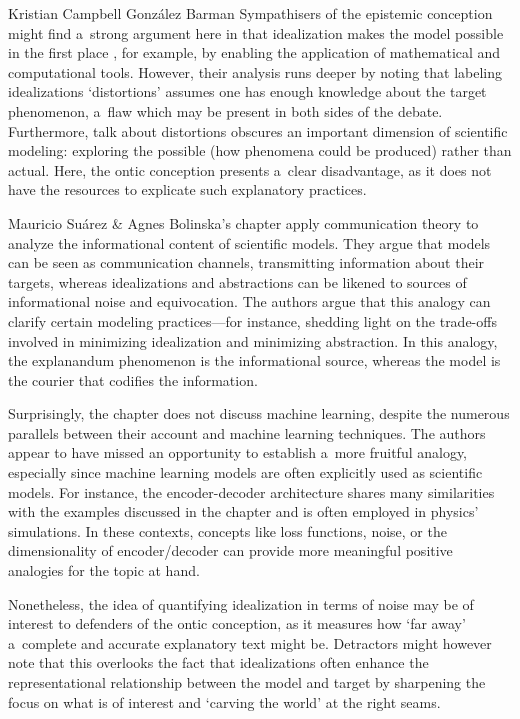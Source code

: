 \begin{recengenv}{Kristian Campbell González Barman}
Sympathisers of the epistemic conception might find a~strong argument here in that idealization makes the model possible in the first place
\parencite[][p.57]{cassini_models_2021}, %
 for example, by enabling the application of mathematical and computational tools. However, their analysis runs deeper by noting that labeling idealizations ‘distortions' assumes one has enough knowledge about the target phenomenon, a~flaw which may be present in both sides of the debate. Furthermore, talk about distortions obscures an important dimension of scientific modeling: exploring the possible (how phenomena could be produced) rather than actual. Here, the ontic conception presents a~clear disadvantage, as it does not have the resources to explicate such explanatory practices.

Mauricio Suárez \& Agnes Bolinska's chapter apply communication theory to analyze the informational content of scientific models. They argue that models can be seen as communication channels, transmitting information about their targets, whereas idealizations and abstractions can be likened to sources of informational noise and equivocation. The authors argue that this analogy can clarify certain modeling practices---for instance, shedding light on the trade-offs involved in minimizing idealization and minimizing abstraction. In this analogy, the explanandum phenomenon is the informational source, whereas the model is the courier that codifies the information.

\enlargethispage{-.5\baselineskip}

Surprisingly, the chapter does not discuss machine learning, despite the numerous parallels between their account and machine learning techniques. The authors appear to have missed an opportunity to establish a~more fruitful analogy, especially since machine learning models are often explicitly used as scientific models. For instance, the encoder-decoder architecture shares many similarities with the examples discussed in the chapter and is often employed in physics' simulations. In these contexts, concepts like loss functions, noise, or the dimensionality of encoder/decoder can provide more meaningful positive analogies for the topic at hand.

Nonetheless, the idea of quantifying idealization in terms of noise may be of interest to defenders of the ontic conception, as it measures how ‘far away' a~complete and accurate explanatory text might be. Detractors might however note that this overlooks the fact that idealizations often enhance the representational relationship between the model and target by sharpening the focus on what is of interest and ‘carving the world' at the right seams.


\end{recengenv}
